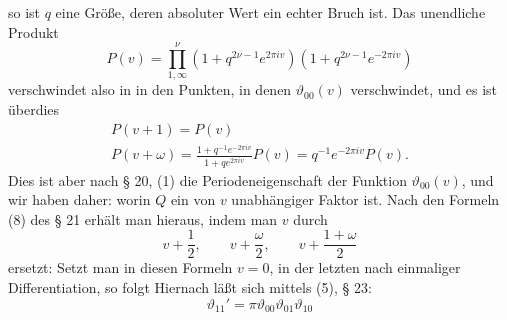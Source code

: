 so ist $q$ eine Gr\"o\ss{}e, deren absoluter Wert ein echter Bruch ist. Das 
unendliche Produkt
\[
P(v) = \prod_{1,\infty}^{\nu} (1 + q^{2\nu-1}e^{2\pi i v})(1 + q^{2\nu-1}e^{-2\pi i v})
\]
verschwindet also in  in den Punkten, in denen $\vartheta_{00}(v)$
verschwindet, und es ist \"uberdies
\[
\begin{gathered}
P(v+1) = P(v)\\
P(v+\omega) = \frac{1+q^{-1}e^{-2\pi i v}}{1+qe^{2\pi i v}}P(v) = q^{-1}e^{-2\pi i v}P(v).
\end{gathered}
\]
Dies ist aber nach § 20, (1) die Periodeneigenschaft der Funktion $\vartheta_{00}(v)$, und
wir haben daher:
worin $Q$ ein von $v$ unabh\"angiger Faktor ist. Nach den Formeln (8) des § 21 erh\"alt man
hieraus, indem man $v$ durch
\[
v + \frac{1}{2}, \qquad v + \frac{\omega}{2}, \qquad v + \frac{1+\omega}{2}
\]
ersetzt:
Setzt man in diesen Formeln $v = 0$, in der letzten nach einmaliger Differentiation, so
folgt
Hiernach l\"a\ss{}t sich mittels (5), § 23:
\[
\vartheta_{11}' = \pi\vartheta_{00}\vartheta_{01}\vartheta_{10}
\]
